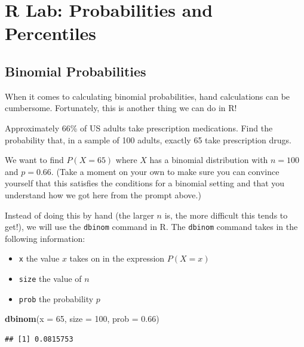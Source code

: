 \documentclass[
]{book}
\newenvironment{Shaded}{\begin{snugshade}}{\end{snugshade}}
\newcommand{\AttributeTok}[1]{\textcolor[rgb]{0.13,0.29,0.53}{#1}}
\newcommand{\DecValTok}[1]{\textcolor[rgb]{0.00,0.00,0.81}{#1}}
\newcommand{\FloatTok}[1]{\textcolor[rgb]{0.00,0.00,0.81}{#1}}
\newcommand{\FunctionTok}[1]{\textcolor[rgb]{0.13,0.29,0.53}{\textbf{#1}}}
\newcommand{\NormalTok}[1]{#1}
\providecommand{\tightlist}{%
  \setlength{\itemsep}{0pt}\setlength{\parskip}{0pt}}
\begin{document}
\section*{R Lab: Probabilities and Percentiles}\label{r-lab-probabilities-and-percentiles}

\subsection*{Binomial Probabilities}\label{binomial-probabilities}

When it comes to calculating binomial probabilities, hand calculations can be cumbersome. Fortunately, this is another thing we can do in R!

Approximately 66\% of US adults take prescription medications. Find the probability that, in a sample of 100 adults, exactly 65 take prescription drugs.

We want to find \(P(X = 65)\) where \(X\) has a binomial distribution with \(n=100\) and \(p=0.66\). (Take a moment on your own to make sure you can convince yourself that this satisfies the conditions for a binomial setting and that you understand how we got here from the prompt above.)

Instead of doing this by hand (the larger \(n\) is, the more difficult this tends to get!), we will use the \texttt{dbinom} command in R. The \texttt{dbinom} command takes in the following information:

\begin{itemize}
\tightlist
\item
  \texttt{x} the value \(x\) takes on in the expression \(P(X=x)\)
\item
  \texttt{size} the value of \(n\)
\item
  \texttt{prob} the probability \(p\)
\end{itemize}

\begin{Shaded}
\begin{Highlighting}[]
\FunctionTok{dbinom}\NormalTok{(}\AttributeTok{x =} \DecValTok{65}\NormalTok{, }\AttributeTok{size =} \DecValTok{100}\NormalTok{, }\AttributeTok{prob =} \FloatTok{0.66}\NormalTok{)}
\end{Highlighting}
\end{Shaded}

\begin{verbatim}
## [1] 0.0815753
\end{verbatim}
\end{document}

